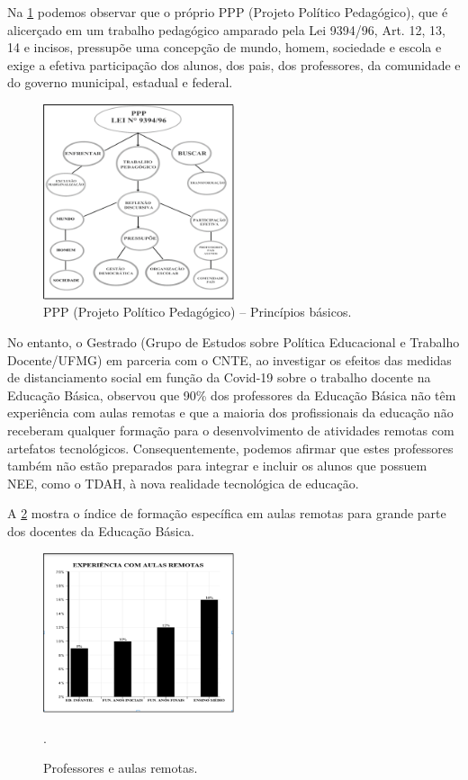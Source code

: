 \documentclass{textolivre}
\begin{document}
Na \cref{Fig02} podemos observar que o próprio PPP (Projeto Político Pedagógico), que é alicerçado em um trabalho pedagógico amparado pela Lei 9394/96, Art. 12, 13, 14 e incisos, pressupõe uma concepção de mundo, homem, sociedade e escola e exige a efetiva participação dos alunos, dos pais, dos professores, da comunidade e do governo municipal, estadual e federal. 

\begin{figure}[htbp]
 \centering
 \includegraphics[width=0.5\textwidth]{Fig02.png}
 \caption{PPP (Projeto Político Pedagógico) – Princípios básicos.}
 \label{Fig02}
\end{figure}

No entanto, o Gestrado (Grupo de Estudos sobre Política Educacional e Trabalho Docente/UFMG) em parceria com o CNTE, ao investigar os efeitos das medidas de distanciamento social em função da Covid-19 sobre o trabalho docente na Educação Básica, observou que 90\% dos professores da Educação Básica não têm experiência com aulas remotas e que a maioria dos profissionais da educação não receberam qualquer formação para o desenvolvimento de atividades remotas com artefatos tecnológicos. Consequentemente, podemos afirmar que estes professores também não estão preparados para integrar e incluir os alunos que possuem NEE, como o TDAH, à nova realidade tecnológica de educação. 

A \cref{Fig03} mostra o índice de formação específica em aulas remotas para grande parte dos docentes da Educação Básica. 

\begin{figure}[htbp]
 \centering
 \includegraphics[width=0.5\textwidth]{Fig03.png}
 \caption{Professores e aulas remotas.}
 \label{Fig03}
 .
\end{figure}
\end{document}
